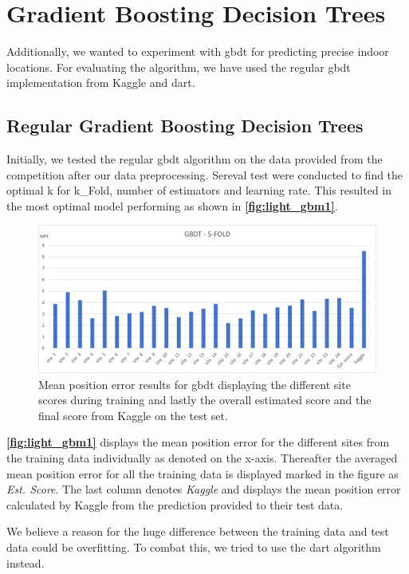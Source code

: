 \section{Gradient Boosting Decision Trees}

Additionally, we wanted to experiment with \gls{gbdt} for predicting precise indoor locations. For evaluating the algorithm, we have used the regular \gls{gbdt} implementation from Kaggle and \gls{dart}.

\subsection{Regular Gradient Boosting Decision Trees}
Initially, we tested the regular \gls{gbdt} algorithm on the data provided from the competition after our data preprocessing. Sereval test were conducted to find the optimal k for k\_Fold, number of estimators and learning rate. This resulted in the most optimal model performing as shown in \textbf{\autoref{fig:light_gbm1}}.

\begin{figure}[H]
    \centering
    \includegraphics[scale=0.6]{Images/Experiments/lightgbm/GBDT-5.png}
    \caption{Mean position error results for \gls{gbdt} displaying the different site scores during training and lastly the overall estimated score and the final score from Kaggle on the test set.}
    \label{fig:light_gbm1}
\end{figure}

\textbf{\autoref{fig:light_gbm1}} displays the mean position error for the different sites from the training data individually as denoted on the x-axis. Thereafter the averaged mean position error for all the training data is displayed marked in the figure as \textit{Est. Score}. The last column denotes \textit{Kaggle} and displays the mean position error calculated by Kaggle from the prediction provided to their test data.

We believe a reason for the huge difference between the training data and test data could be overfitting. To combat this, we tried to use the \gls{dart} algorithm instead.

